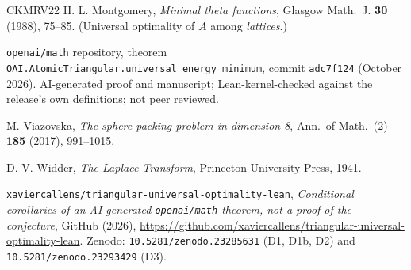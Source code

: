 \documentclass[11pt, a4paper]{article}
\theoremstyle{definition}
\theoremstyle{remark}
\begin{document}
\begin{thebibliography}{CKMRV22}
 H. L. Montgomery, \emph{Minimal theta functions}, Glasgow Math.\ J. \textbf{30} (1988), 75--85. (Universal optimality of $A$ among \emph{lattices}.)

 \texttt{openai/math} repository, theorem \texttt{OAI.\allowbreak AtomicTriangular.\allowbreak universal\_energy\_minimum}, commit \texttt{adc7f124} (October 2026). AI-generated proof and manuscript; Lean-kernel-checked against the release's own definitions; not peer reviewed.

 M. Viazovska, \emph{The sphere packing problem in dimension 8}, Ann.\ of Math.\ (2) \textbf{185} (2017), 991--1015.

 D. V. Widder, \emph{The Laplace Transform}, Princeton University Press, 1941.

 \texttt{xaviercallens/triangular-universal-optimality-lean}, \emph{Conditional corollaries of an AI-generated \texttt{openai/math} theorem, not a proof of the conjecture}, GitHub (2026), \url{https://github.com/xaviercallens/triangular-universal-optimality-lean}. Zenodo: \texttt{10.5281/zenodo.23285631} (D1, D1b, D2) and \texttt{10.5281/zenodo.23293429} (D3).

\end{thebibliography}
\end{document}
